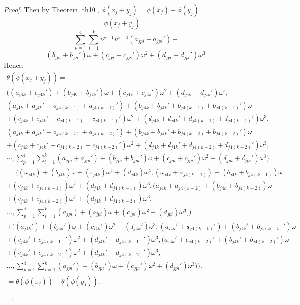 \documentclass{amsart}
\theoremstyle{definition}
\theoremstyle{remark}
\numberwithin{equation}{section}
\begin{document}
\begin{proof}
  Then by Theorem \ref{th10}, $\phi(x_j + y_j)= \phi(x_j) + \phi(y_j)$.
$$  \phi(x_j+y_j) = $$
$$ \sum_{p=1}^{4} \sum_{i=1}^{k} v^{p-1}u^{i-1}(a_{jpi}+a_{jpi}')+ $$ $$(b_{jpi}+b_{jpi}')\omega+(c_{jpi}+c_{jpi}')\omega^2+(d_{jpi}+d_{jpi}')\omega^3.$$
  Hence, \allowdisplaybreaks\begin{gather*}
      \theta(\phi(x_j+y_j)) =\\ ((a_{j4k}+a_{j4k}')+(b_{j4k}+b_{j4k}')\omega+(c_{j4k}+c_{j4k}')\omega^2+(d_{j4k}+d_{j4k}')\omega^3 ,\\ (a_{j4k}+a_{j4k}'+a_{j4(k-1)}+a_{j4(k-1)}')+(b_{j4k}+b_{j4k}'+b_{j4(k-1)}+b_{j4(k-1)}')\omega\\ +(c_{j4k}+c_{j4k}'+c_{j4(k-1)}+c_{j4(k-1)}')\omega^2+(d_{j4k}+d_{j4k}'+d_{j4(k-1)}+d_{j4(k-1)}')\omega^3  ,\\ (a_{j4k}+a_{j4k}'+a_{j4(k-2)}+a_{j4(k-2)}')+(b_{j4k}+b_{j4k}'+b_{j4(k-2)}+b_{j4(k-2)}')\omega\\ +(c_{j4k}+c_{j4k}'+c_{j4(k-2)}+c_{j4(k-2)}')\omega^2+(d_{j4k}+d_{j4k}'+d_{j4(k-2)}+d_{j4(k-2)}')\omega^3 ,\\
      \cdots ,  \sum_{p=1}^{4} \sum_{i=1}^{k} (a_{jpi}+a_{jpi}')+(b_{jpi}+b_{jpi}')\omega+(c_{jpi}+c_{jpi}')\omega^2+(d_{jpi}+d_{jpi}')\omega^3 ).
      \\  = ((a_{j4k})+(b_{j4k})\omega+(c_{j4k})\omega^2+(d_{j4k})\omega^3 ,(a_{j4k}+a_{j4(k-1)})+(b_{j4k}+b_{j4(k-1)})\omega\\ +(c_{j4k}+c_{j4(k-1)})\omega^2+(d_{j4k}+d_{j4(k-1)})\omega^3  , (a_{j4k}+a_{j4(k-2)}+(b_{j4k}+b_{j4(k-2)})\omega\\ +(c_{j4k}+c_{j4(k-2)})\omega^2+(d_{j4k}+d_{j4(k-2)})\omega^3 ,\\
      \dots ,  \sum_{p=1}^{4} \sum_{i=1}^{k} (a_{jpi})+(b_{jpi})\omega+(c_{jpi})\omega^2+(d_{jpi})\omega^3 )) \\
      + ((a_{j4k}')+(b_{j4k}')\omega+(c_{j4k}')\omega^2+(d_{j4k}')\omega^3 ,(a_{j4k}'+a_{j4(k-1)}')+(b_{j4k}'+b_{j4(k-1)}')\omega\\ +(c_{j4k}'+c_{j4(k-1)}')\omega^2+(d_{j4k}'+d_{j4(k-1)}')\omega^3  , (a_{j4k}'+a_{j4(k-2)}'+(b_{j4k}'+b_{j4(k-2)}')\omega\\ +(c_{j4k}'+c_{j4(k-2)}')\omega^2+(d_{j4k}'+d_{j4(k-2)}')\omega^3 ,\\
      \dots ,  \sum_{p=1}^{4} \sum_{i=1}^{k} (a_{jpi}')+(b_{jpi}')\omega+(c_{jpi}')\omega^2+(d_{jpi}')\omega^3 )).
      \\ =  \theta(\phi(x_j)) +  \theta(\phi(y_j)).
      \end{gather*}
      \begin{gather*}

\end{gather*}
\end{proof}
\end{document}
